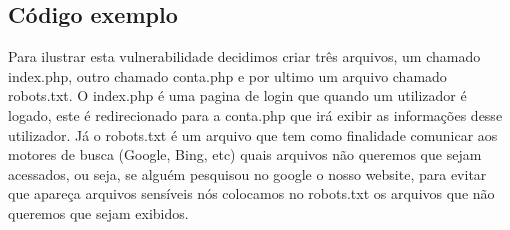 \documentclass{report}
\begin{document}
\subsection{Código exemplo}	

Para ilustrar esta vulnerabilidade decidimos criar três arquivos, um chamado index.php, outro chamado conta.php e por ultimo um arquivo chamado robots.txt. O index.php é uma pagina de login que quando um utilizador é logado, este é redirecionado para a conta.php que irá exibir as informações desse utilizador. Já o robots.txt é um arquivo que tem como finalidade comunicar aos motores de busca (Google, Bing, etc) quais arquivos não queremos que sejam acessados, ou seja, se alguém pesquisou no google o nosso website, para evitar que apareça arquivos sensíveis nós colocamos no robots.txt os arquivos que não queremos que sejam exibidos.
\end{document}
